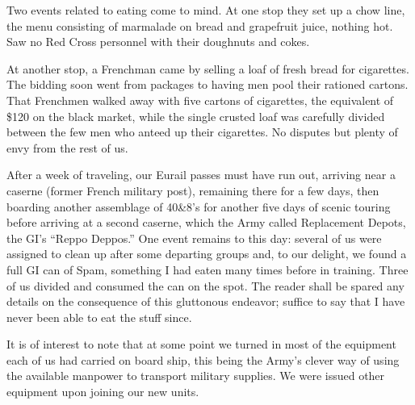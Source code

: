\documentclass[../m3y]{subfiles}
\begin{document}
Two events related to eating come to mind. At one stop they set up a chow line, the menu consisting of marmalade on bread and grapefruit juice, nothing hot. Saw no Red Cross personnel with their doughnuts and cokes.

At another stop, a Frenchman came by selling a loaf of fresh bread for cigarettes. The bidding soon went from packages to having men pool their rationed cartons. That  Frenchmen walked away with five cartons of cigarettes, the equivalent of \$120 on the black market, while the single crusted loaf was carefully divided between the few men who anteed up their cigarettes. No disputes but plenty of envy from the rest of us.

After a week of traveling, our Eurail passes must have run out, arriving near a caserne (former French military post), remaining there for a few days, then boarding another assemblage of 40\&8's for another five days of scenic touring before arriving at a second caserne, which the Army called Replacement Depots, the GI's ``Reppo Deppos.'' One event remains to this day: several of us were assigned to clean up after some departing groups and, to our delight, we found a full GI can of Spam, something I had eaten many times before in training. Three of us divided and consumed the can on the spot. The reader shall be spared any details on the consequence of this gluttonous endeavor; suffice to say that I have never been able to eat the stuff since.

It is of interest to note that at some point we turned in most of the equipment each of us had carried on board ship, this being the Army's clever way of using the available manpower to transport military supplies. We were issued other equipment upon joining our new units.
\end{document}
